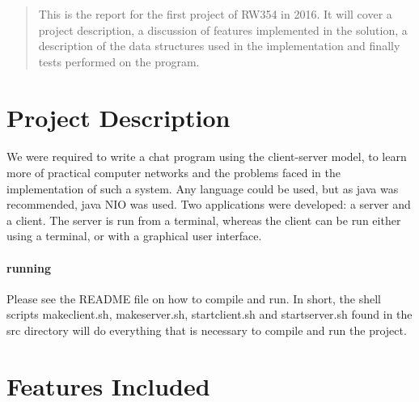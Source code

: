 \documentclass[12pt]{article}
\begin{document}
\maketitle

\begin{abstract}
This is the report for the first project of RW354 in 2016. It will cover a
project description, a discussion of features implemented in the solution, 
a description of the data structures used in the implementation and finally
tests performed on the program.  
\end{abstract}

\section{Project Description}

\paragraph{}
We were required to write a chat program using the client-server model, to learn
more of practical computer networks and the problems faced in the implementation
of such a system. Any language could be used, but as java was recommended, java
NIO was used. Two applications were developed:  a server and a client.  The
server is run from a terminal, whereas the client can be run either using a
terminal, or with a graphical user interface.  

\paragraph{running}
Please see the README file on how to compile and run.  In short, the
shell scripts makeclient.sh, makeserver.sh, startclient.sh and startserver.sh
found in the src directory will do everything that is necessary to compile and run the project.

\section{Features Included}
\end{document}
